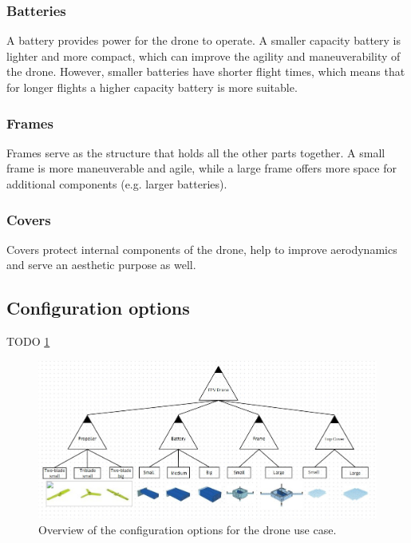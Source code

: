 \documentclass[sigconf,review]{acmart}
\begin{document}
\subsubsection{Batteries}
\label{sec:batteries}

A battery provides power for the drone to operate. 
A smaller capacity battery is lighter and more compact, which can improve the agility and maneuverability of the drone. 
However, smaller batteries have shorter flight times, which means that for longer flights a higher capacity battery is more suitable.

\subsubsection{Frames}
\label{sec:frames}

Frames serve as the structure that holds all the other parts together. 
A small frame is more maneuverable and agile, while a large frame offers more space for additional components (e.g. larger batteries).

\subsubsection{Covers}
\label{sec:covers}

Covers protect internal components of the drone, help to improve aerodynamics and serve an aesthetic purpose as well.

\subsection{Configuration options}
\label{sec:configuration-options}

TODO \cref{fig:feature-tree}

\begin{figure}[htbp]
    \includegraphics[width=\textwidth]{./drone-case-feature-tree.jpg}
    \caption{Overview of the configuration options for the drone use case.}
    \label{fig:feature-tree}
\end{figure}
\end{document}
